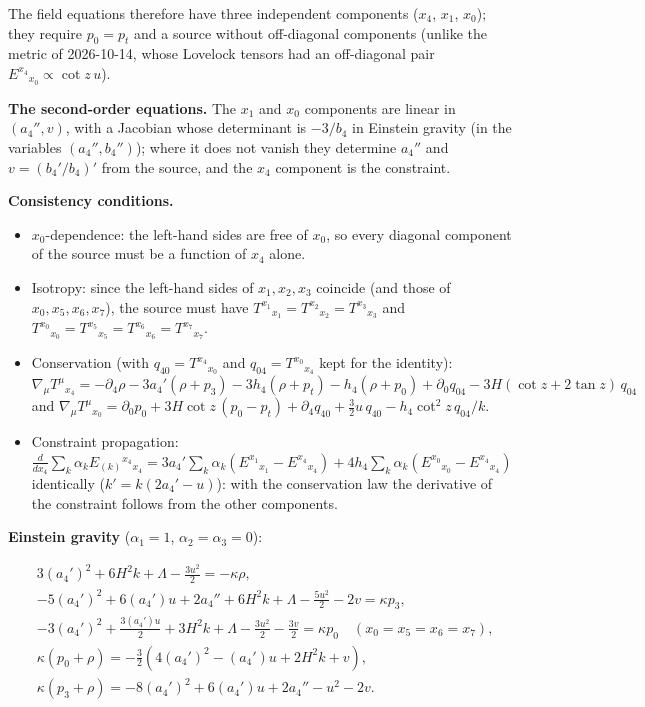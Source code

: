 \documentclass[11pt]{article}
\begin{document}
The field equations therefore have three independent components ($x_4$, $x_1$, $x_0$); they require $p_0 = p_t$ and a source without off-diagonal components (unlike the metric of 2026-10-14, whose Lovelock tensors had an off-diagonal pair $E^{x_4}{}_{x_0} \propto \cot z\,u$).

\textbf{The second-order equations.} The $x_1$ and $x_0$ components are linear in $(a_4'', v)$, with a Jacobian whose determinant is $-3/b_4$ in Einstein gravity (in the variables $(a_4'', b_4'')$); where it does not vanish they determine $a_4''$ and $v = (b_4'/b_4)'$ from the source, and the $x_4$ component is the constraint.

\textbf{Consistency conditions.}

\begin{itemize}
\item $x_0$-dependence: the left-hand sides are free of $x_0$, so every diagonal component of the source must be a function of $x_4$ alone.
\item Isotropy: since the left-hand sides of $x_1, x_2, x_3$ coincide (and those of $x_0, x_5, x_6, x_7$), the source must have $T^{x_1}{}_{x_1} = T^{x_2}{}_{x_2} = T^{x_3}{}_{x_3}$ and $T^{x_0}{}_{x_0} = T^{x_5}{}_{x_5} = T^{x_6}{}_{x_6} = T^{x_7}{}_{x_7}$.
\item Conservation (with $q_{40} = T^{x_4}{}_{x_0}$ and $q_{04} = T^{x_0}{}_{x_4}$ kept for the identity): $\nabla_\mu T^\mu{}_{x_4} = -\partial_4\rho - 3a_4'(\rho + p_3) - 3h_4(\rho + p_t) - h_4(\rho + p_0) + \partial_0 q_{04} - 3H(\cot z + 2\tan z)\,q_{04}$ and $\nabla_\mu T^\mu{}_{x_0} = \partial_0 p_0 + 3H\cot z\,(p_0 - p_t) + \partial_4 q_{40} + \tfrac32u\,q_{40} - h_4\cot^2 z\,q_{04}/k$.
\item Constraint propagation: $\tfrac{d}{dx_4}\sum_k\alpha_k E_{(k)}{}^{x_4}{}_{x_4} = 3a_4'\sum_k\alpha_k(E^{x_1}{}_{x_1} - E^{x_4}{}_{x_4}) + 4h_4\sum_k\alpha_k(E^{x_0}{}_{x_0} - E^{x_4}{}_{x_4})$ identically ($k' = k(2a_4' - u)$): with the conservation law the derivative of the constraint follows from the other components.
\end{itemize}

\textbf{Einstein gravity} ($\alpha_1 = 1$, $\alpha_2 = \alpha_3 = 0$):

\[
\begin{aligned}
& 3 (a_4')^2+6 H^2 k+\Lambda-\frac{3 u^2}{2} = -\kappa  \rho, \\
& -5 (a_4')^2+6 (a_4') u+2 a_4''+6 H^2 k+\Lambda-\frac{5 u^2}{2}-2 v = \kappa  p_3, \\
& -3 (a_4')^2+\frac{3 (a_4') u}{2}+3 H^2 k+\Lambda-\frac{3 u^2}{2}-\frac{3 v}{2} = \kappa  p_0 \quad (x_0 = x_5 = x_6 = x_7), \\
& \kappa  (p_0+\rho ) = -\frac{3}{2} \left(4 (a_4')^2-(a_4') u+2 H^2 k+v\right), \\
& \kappa  (p_3+\rho ) = -8 (a_4')^2+6 (a_4') u+2 a_4''-u^2-2 v.
\end{aligned}
\]
\end{document}
